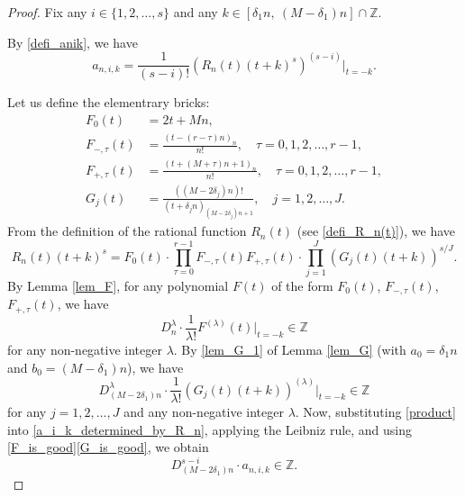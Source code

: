 \documentclass[12pt]{article}
\numberwithin{equation}{section}
\begin{document}
\begin{proof}
Fix any $i \in \{1,2,\ldots,s\}$ and any $k \in [\delta_1n,~(M-\delta_1)n] \cap \mathbb{Z}$.

By \eqref{defi_anik}, we have
\begin{equation}\label{a_i_k_determined_by_R_n}
a_{n,i,k} = \frac{1}{(s-i)!} \left( R_n(t)(t+k)^{s} \right)^{(s-i)} \Big|_{t=-k}.
\end{equation}

Let us define the elementrary bricks:
\begin{align*}
	F_0(t) &= 2t+Mn, \\
	F_{-,\tau}(t) &= \frac{(t-(r-\tau)n)_{n}}{n!}, \quad \tau=0,1,2,\ldots,r-1, \\
	F_{+,\tau}(t) &= \frac{(t+(M+\tau)n+1)_{n}}{n!}, \quad \tau=0,1,2,\ldots,r-1, \\
	G_j(t) &=  \frac{((M-2\delta_j)n)!}{(t+\delta_jn)_{(M-2\delta_j)n+1}}, \quad j=1,2,\ldots,J.
\end{align*}
From the definition of the rational function $R_n(t)$ (see \eqref{defi_R_n(t)}), we have 
\begin{equation}\label{product}
R_n(t)(t+k)^s = F_{0}(t) \cdot \prod_{\tau=0}^{r-1} F_{-,\tau}(t)F_{+,\tau}(t) \cdot \prod_{j=1}^{J} \left(G_j(t)(t+k)\right)^{s/J}. 
\end{equation}
By Lemma \ref{lem_F}, for any polynomial $F(t)$ of the form $F_0(t)$, $F_{-,\tau}(t)$, $F_{+,\tau}(t)$, we have
\begin{equation}\label{F_is_good}
D_{n}^{\lambda} \cdot \frac{1}{\lambda!} F^{(\lambda)}(t) \big|_{t=-k} \in \mathbb{Z} 
\end{equation} 
for any non-negative integer $\lambda$.
By \eqref{lem_G_1} of Lemma \ref{lem_G} (with $a_0 = \delta_1n$ and $b_0 = (M-\delta_1)n$), we have
\begin{equation}\label{G_is_good}
D_{(M-2\delta_1)n}^{\lambda} \cdot \frac{1}{\lambda!} \left( G_j(t)(t+k) \right)^{(\lambda)} \big|_{t=-k} \in \mathbb{Z} 
\end{equation}
for any $j=1,2,\ldots,J$ and any non-negative integer $\lambda$. Now, substituting \eqref{product} into \eqref{a_i_k_determined_by_R_n}, applying the Leibniz rule, and using \eqref{F_is_good}\eqref{G_is_good}, we obtain
\begin{equation}\label{arith_anik_1}
D_{(M-2\delta_1)n}^{s-i} \cdot  a_{n,i,k} \in \mathbb{Z}.
\end{equation} 


\end{proof}
\end{document}
